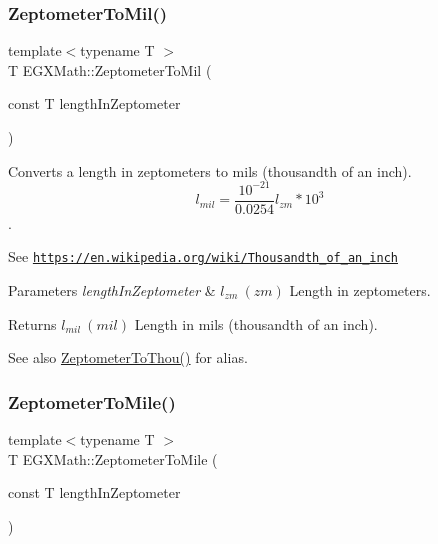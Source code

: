 \subsubsection{\texorpdfstring{Zeptometer\+To\+Mil()}{ZeptometerToMil()}}
{\footnotesize\ttfamily template$<$typename T $>$ \\
T E\+G\+X\+Math\+::\+Zeptometer\+To\+Mil (\begin{DoxyParamCaption}\item[{const T}]{length\+In\+Zeptometer }\end{DoxyParamCaption})}



Converts a length in zeptometers to mils (thousandth of an inch). \[ l_{mil}= \frac{10^{-21}}{0.0254} l_{zm} * 10^{3} \]. 

See \href{https://en.wikipedia.org/wiki/Thousandth_of_an_inch}{\tt https\+://en.\+wikipedia.\+org/wiki/\+Thousandth\+\_\+of\+\_\+an\+\_\+inch} 
\begin{DoxyParams}{Parameters}
{\em length\+In\+Zeptometer} & $ l_{zm}\ (zm)$ Length in zeptometers. \\
\hline
\end{DoxyParams}
\begin{DoxyReturn}{Returns}
$ l_{mil}\ (mil)$ Length in mils (thousandth of an inch). 
\end{DoxyReturn}
\begin{DoxySeeAlso}{See also}
\mbox{\hyperlink{group___e_g_x_math-_conversions-_length_conversions-_zeptometer-_imperial_ga14432ed712e073dcae040496f83464b6}{Zeptometer\+To\+Thou()}} for alias. 
\end{DoxySeeAlso}
\mbox{\label{group___e_g_x_math-_conversions-_length_conversions-_zeptometer-_imperial_ga2cd73cc7564758f2bf88f1a6e9269aff}} 
\subsubsection{\texorpdfstring{Zeptometer\+To\+Mile()}{ZeptometerToMile()}}
{\footnotesize\ttfamily template$<$typename T $>$ \\
T E\+G\+X\+Math\+::\+Zeptometer\+To\+Mile (\begin{DoxyParamCaption}\item[{const T}]{length\+In\+Zeptometer }\end{DoxyParamCaption})}



